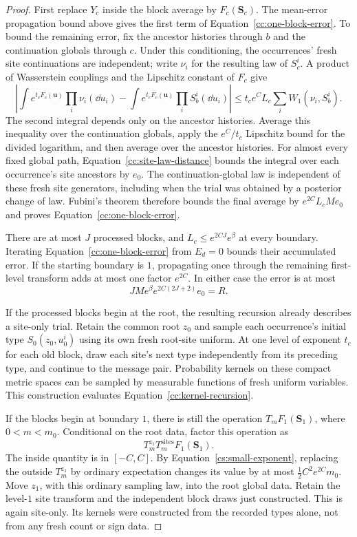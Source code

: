\begin{proof}
First replace $Y_c$ inside the block average by
$F_c(\mathbf S_c)$.  The mean-error propagation bound above gives
the first term of Equation~\eqref{cc:one-block-error}.  To bound the remaining error, fix the
ancestor histories through $b$ and the continuation globals through
$c$.  Under this conditioning, the occurrences' fresh site
continuations are independent; write $\nu_i$ for the resulting law
of $S_c^i$.  A product of Wasserstein couplings and the Lipschitz
constant of $F_c$ give
\[
 \left|\int e^{t_cF_c(\mathbf u)}\prod_i\nu_i(\dd u_i)
       -\int e^{t_cF_c(\mathbf u)}\prod_iS_b^i(\dd u_i)\right|
 \le t_ce^C L_c\sum_i W_1(\nu_i,S_b^i).
\]
The second integral depends only on the ancestor histories.  Average
this inequality over the continuation globals, apply the
$e^C/t_c$ Lipschitz bound for the divided logarithm, and then average
over the ancestor histories.  For almost every fixed global path,
Equation~\eqref{cc:site-law-distance} bounds the integral over each
occurrence's site ancestors by $e_0$.  The continuation-global law
is independent of these fresh site generators, including when the
trial was obtained by a posterior change of law.  Fubini's theorem
therefore bounds the final average by $e^{2C}L_cMe_0$ and proves Equation~\eqref{cc:one-block-error}.

There are at most $J$ processed blocks, and
$L_c\le e^{2CJ}e^\beta$ at every boundary.  Iterating Equation~\eqref{cc:one-block-error} from
$E_d=0$ bounds their accumulated error.  If the starting boundary
is $1$, propagating once through the remaining first-level transform
adds at most one factor $e^{2C}$.  In either case the error is at most
\[
 JM e^\beta e^{2C(2J+2)}e_0=R.
\]

If the processed blocks begin at the root, the resulting recursion
already describes a site-only trial. Retain the common root $z_0$
and sample each occurrence's initial type $S_0(z_0,u_0^i)$ using its
own fresh root-site uniform. At one level of exponent $t_c$ for each
old block, draw each site's next type independently from its preceding
type, and continue to the message pair.  Probability kernels on these compact metric spaces
can be sampled by measurable functions of fresh uniform variables.
This construction evaluates Equation~\eqref{cc:kernel-recursion}.

If the blocks begin at boundary $1$, there is still the operation
$T_mF_1(\mathbf S_1)$, where $0<m<m_0$.  Conditional on the root data,
factor this operation as
\[
 T_m^{z_1}T_m^{\mathrm{sites}}F_1(\mathbf S_1).
\]
The inside quantity is in $[-C,C]$.  By
Equation~\eqref{cs:small-exponent}, replacing the outside
$T_m^{z_1}$ by ordinary expectation changes its value by at most
$\tfrac12 C^2e^{2C}m_0$.  Move $z_1$, with this ordinary sampling law,
into the root global data.  Retain the level-$1$ site transform and
the independent block draws just constructed.  This is again
site-only.  Its kernels were constructed from the recorded types
alone, not from any fresh count or sign data.


\end{proof}
